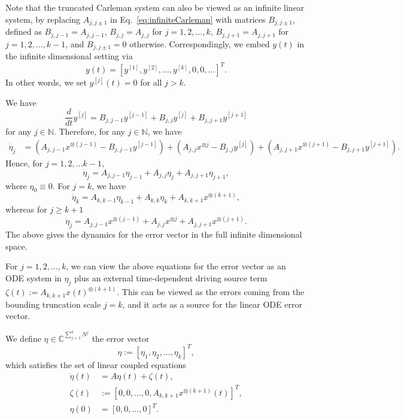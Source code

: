 \documentclass[superscriptaddress,onecolumn,nofootinbib,longbibliography,a4paper,accepted=2026-09-29]{quantumarticle}
\theoremstyle{plain}
\theoremstyle{definition}
\numberwithin{thm}{section}
\numberwithin{assumption}{section}
\numberwithin{lemma}{section}
\numberwithin{prop}{section}
\numberwithin{cor}{section}
\numberwithin{definition}{section}
\numberwithin{rmk}{section}
\numberwithin{equation}{section}
\newcommand{\ot}{\otimes}
\begin{document}
Note that the truncated Carleman system can also be viewed as an infinite linear system, by replacing $A_{j,j \pm 1}$ in Eq.~\eqref{eq:infiniteCarleman} with matrices $B_{j,j\pm 1 }$, defined as $B_{j,j-1} = A_{j,j-1}$, $B_{j,j} = A_{j,j}$  for $j=1, 2, \dots, k$, $B_{j,j+1} = A_{j,j+1}$ for  $j=1, 2, \dots, k-1$, and $B_{j,j\pm 1} =0$ otherwise. Correspondingly, we embed $y(t)$ in the infinite dimensional setting via
\begin{equation}
    y(t) = [y^{[1]}, y^{[2]}, \dots , y^{[k]}, 0, 0, \dots]^T.
\end{equation}
In other words, we set $y^{[j]}(t) = 0$ for all $j> k$. 

We have
\begin{equation}
    \frac{d}{dt}y^{[j]} = B_{j,j-1} y^{[j-1]} + B_{j,j} y^{[j]} + B_{j,j+1} y^{[j+1]} 
\end{equation}
for any $j\in \mathbb{N}$. Therefore, for any $j \in \mathbb{N}$, we have
\begin{align}    
    \dot{\eta}_j &= (A_{j,j-1} x^{\ot (j-1)} - B_{j,j-1} y^{[j-1]}) +(A_{j,j} x^{\ot j} - B_{j,j} y^{[j]}) +(A_{j,j+1} x^{\ot (j+1)} - B_{j,j+1} y^{[j+1]}). 
\end{align}
Hence, for $j=1,2,\dots k-1$,
\begin{equation}
    \dot{\eta}_j = A_{j,j-1} \eta_{j-1} + A_{j,j} \eta_j + A_{j,j+1} \eta_{j+1},
\end{equation}
where $\eta_0 \equiv 0$. For $j=k$, we have
\begin{equation}
    \dot{\eta}_k = A_{k,k-1} \eta_{k-1} + A_{k,k} \eta_k + A_{k,k+1} x^{\ot (k+1)},
\end{equation}
whereas for $j \ge k+1$
\begin{equation}
    \dot{\eta}_{j} = A_{j,j-1} x^{\ot (j-1)} + A_{j,j} x^{\ot j} + A_{j,j+1} x^{\ot (j+1)} .
\end{equation}
The above gives the dynamics for the error vector in the full infinite dimensional space.

For $j=1,2,\dots,k$, we can view the above equations for the error vector as an ODE system in $\eta_j$ plus an external time-dependent driving source term $\zeta(t):=A_{k,k+1} x(t)^{\ot (k+1)}$. This can be viewed as the errors coming from the bounding truncation scale $j=k$, and it acts as a source for the linear ODE error vector.

We define $\eta \in \mathbb{C}^{\sum^{k}_{j=1} N^j}$ the error vector
\begin{equation}
    \eta := [\eta_1, \eta_2, \dots, \eta_{k}]^T,
\end{equation}
which satisfies the set of linear coupled equations
\begin{equation}
\begin{aligned}
    \dot{\eta}(t) &= A \eta(t) + \zeta(t), \nonumber \\
    \zeta(t) &:= [0, 0, \dots , 0, A_{k,k+1} x^{\ot (k+1)}(t)]^T, \\
    \eta(0) &= [0,0,\dots, 0]^T. \label{eq:error_evolution}
\end{aligned}
\end{equation}
\end{document}
